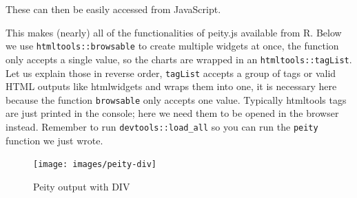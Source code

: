 \documentclass[10pt,]{krantz}
\makeatletter
\newenvironment{Shaded}{\begin{snugshade}}{\end{snugshade}}
\newcommand{\AttributeTok}[1]{\textcolor[rgb]{0.61,0.61,0.61}{#1}}
\newcommand{\DataTypeTok}[1]{\textcolor[rgb]{0.27,0.27,0.27}{#1}}
\newcommand{\DecValTok}[1]{\textcolor[rgb]{0.06,0.06,0.06}{#1}}
\newcommand{\KeywordTok}[1]{\textcolor[rgb]{0.27,0.27,0.27}{\textbf{#1}}}
\newcommand{\NormalTok}[1]{#1}
\newcommand{\OperatorTok}[1]{\textcolor[rgb]{0.43,0.43,0.43}{\textbf{#1}}}
\newcommand{\StringTok}[1]{\textcolor[rgb]{0.5,0.5,0.5}{#1}}
\newcommand{\VariableTok}[1]{\textcolor[rgb]{0,0,0}{#1}}
\newenvironment{kframe}{%
\medskip{}
\setlength{\fboxsep}{.8em}
 \def\at@end@of@kframe{}%
 \ifinner\ifhmode%
  \def\at@end@of@kframe{\end{minipage}}%
  \begin{minipage}{\columnwidth}%
 \fi\fi%
 \def\FrameCommand##1{\hskip\@totalleftmargin \hskip-\fboxsep
 \colorbox{shadecolor}{##1}\hskip-\fboxsep
     \hskip-\linewidth \hskip-\@totalleftmargin \hskip\columnwidth}%
 \MakeFramed {\advance\hsize-\width
   \@totalleftmargin\z@ \linewidth\hsize
   \@setminipage}}%
 {\par\unskip\endMakeFramed%
 \at@end@of@kframe}
\renewenvironment{Shaded}{\begin{kframe}}{\end{kframe}}
\makeatother
\begin{document}
These can then be easily accessed from JavaScript.

\begin{Shaded}
\end{Shaded}

This makes (nearly) all of the functionalities of peity.js available from R. Below we use \texttt{htmltools::browsable} to create multiple widgets at once, the function only accepts a single value, so the charts are wrapped in an \texttt{htmltools::tagList}. Let us explain those in reverse order, \texttt{tagList} accepts a group of tags or valid HTML outputs like htmlwidgets and wraps them into one, it is necessary here because the function \texttt{browsable} only accepts one value. Typically htmltools tags are just printed in the console; here we need them to be opened in the browser instead. Remember to run \texttt{devtools::load\_all} so you can run the \texttt{peity} function we just wrote.

\begin{Shaded}
\end{Shaded}

\begin{figure}[H]

{\centering \texttt{[image: images/peity-div]} 

}

\caption{Peity output with DIV}\label{fig:peity-divs}
\end{figure}
\end{document}
